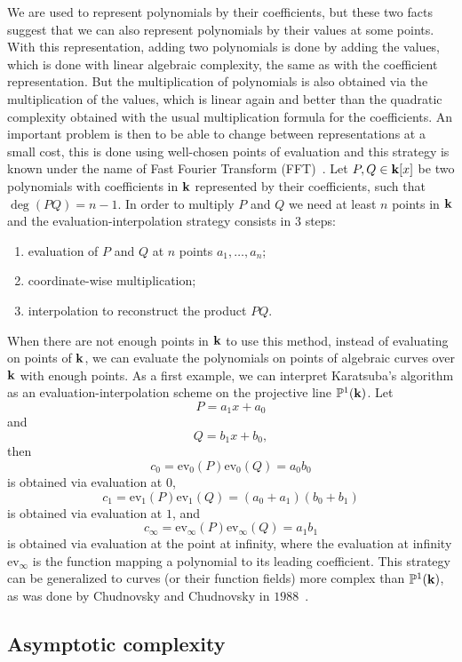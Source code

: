 We are used to represent polynomials by their coefficients, but these two facts
suggest that we can also represent polynomials by their values at some points.
With this representation, adding two polynomials is done by adding the
values, which is done with linear algebraic complexity, the same as with the coefficient
representation. But the multiplication of polynomials is also obtained via the
multiplication of the values, which is linear again and better than the
quadratic complexity obtained with the usual multiplication formula for the
coefficients. An important problem is then to be able to change between
representations at a small cost, this is done using well-chosen points of
evaluation and this strategy is known under the name of Fast Fourier
Transform (FFT)~\cite[Chapter~$8$]{SS71, GG13}. Let $P, Q\in\mathbf{k}[x]$ be two polynomials with
coefficients in $\mathbf{k}$ represented by their coefficients, such that
$\deg(PQ)=n-1$. In order to multiply $P$ and $Q$ we need at least $n$ points in
$\mathbf{k}$ and the evaluation-interpolation strategy consists in $3$ steps:
\begin{enumerate}
  \item evaluation of $P$ and $Q$ at $n$ points $a_1, \dots, a_n$;
  \item coordinate-wise multiplication;
  \item interpolation to reconstruct the product $PQ$.
\end{enumerate}
When there are not enough points in $\mathbf{k}$ to use this method, instead of
evaluating on points of $\mathbf{k}$, we can evaluate the polynomials on points of
algebraic curves over $\mathbf{k}$ with enough points. As a first example, we can interpret
Karatsuba's algorithm as an evaluation-interpolation scheme on
the projective line $\mathbb{P}^1(\mathbf{k})$. Let 
\[
  P = a_1 x + a_0
\]
and 
\[
  Q = b_1 x + b_0,
\]
then
\[
  c_0 = \textrm{ev}_0(P)\textrm{ev}_0(Q) = a_0b_0
\]
is obtained via evaluation at $0$,
\[
  c_1 = \textrm{ev}_1(P)\textrm{ev}_1(Q) = (a_0+a_1)(b_0+b_1)
\]
is obtained via evaluation at $1$, and
\[
  c_\infty = \textrm{ev}_\infty(P)\textrm{ev}_\infty(Q) = a_1b_1
\]
is obtained via evaluation at the point at infinity, where the evaluation at
infinity $\textrm{ev}_{\infty}$ is the function mapping a polynomial to its
leading coefficient. This strategy can be generalized to curves (or their
function fields) more complex
than $\mathbb{P}^1(\mathbf{k})$, as was done by Chudnovsky and Chudnovsky in
$1988$~\cite{CC88}.

\subsection{Asymptotic complexity}

